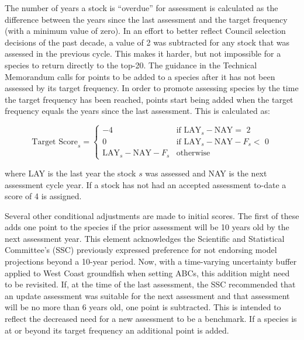 \documentclass[11pt,
  english,
  a4paper,
]{article}
\begin{document}
\leavevmode\tagmcend\tagstructend\par


The number of years a stock is ``overdue'' for assessment is calculated as the difference between the years since the last assessment and the target frequency (with a minimum value of zero). In an effort to better reflect Council selection decisions of the past decade, a value of 2 was subtracted for any stock that was assessed in the previous cycle. This makes it harder, but not impossible for a species to return directly to the top-20. The guidance in the Technical Memorandum calls for points to be added to a species after it has not been assessed by its target frequency. In order to promote assessing species by the time the target frequency has been reached, points start being added when the target frequency equals the years since the last assessment. This is calculated as:

\leavevmode\tagmcend\tagstructend\par


{\[
\text{Target Score}_s = 
\begin{cases}
-4 & \text{if $\text{LAY}_{s} - \text{NAY} =$ 2}\\
0  & \text{if $\text{LAY}_{s} - \text{NAY} - F_s < $ 0}\\
\text{LAY}_{s} - \text{NAY} - F_s & \text{otherwise}
\end{cases}
\]\leavevmode\tagmcend\tagstructend}

\leavevmode\tagmcend\tagstructend\par


where LAY is the last year the stock {\(s\)\leavevmode\tagmcend\tagstructend} was assessed and NAY is the next assessment cycle year. If a stock has not had an accepted assessment to-date a score of 4 is assigned.

\leavevmode\tagmcend\tagstructend\par


Several other conditional adjustments are made to initial scores. The first of these adds one point to the species if the prior assessment will be 10 years old by the next assessment year. This element acknowledges the Scientific and Statistical Committee's (SSC) previously expressed preference for not endorsing model projections beyond a 10-year period. Now, with a time-varying uncertainty buffer applied to West Coast groundfish when setting ABCs, this addition might need to be revisited. If, at the time of the last assessment, the SSC recommended that an update assessment was suitable for the next assessment and that assessment will be no more than 6 years old, one point is subtracted. This is intended to reflect the decreased need for a new assessment to be a benchmark. If a species is at or beyond its target frequency an additional point is added.
\end{document}
